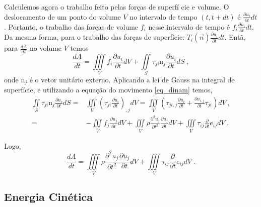 Calculemos agora  o trabalho feito pelas for\c{c}as de superf\'i
cie e volume. O deslocamento de um ponto do volume $V$ no
intervalo de tempo $(t,t+dt)$ \'e $\frac{\partial u_{i}}{\partial
t}dt$. Portanto, o trabalho das  for\c{c}as de volume $f_{i}$ nesse
intervalo de tempo \'e $f_{i}\frac{\partial
u_{i}}{\partial t}dt$. Da mesma forma, para o trabalho das
for\c{c}as de  superf\'icie: $T_{i}(\vec{n})\frac{\partial
u_{i}}{\partial t}dt$. Ent\~a, para $\frac{dA}{dt}$ no volume $V$ temos
\begin{equation}
\frac{dA}{dt}=\iiint\limits_{V}f_{i}\frac{\partial u_{i}}{\partial t}dV+\iint\limits_{S}
\tau_{ji}\mbox{n}_{j}\frac{\partial u_{i}}{\partial t}dS \;,
\end{equation}
onde
$\mbox{n}_{j}$ \'e o vetor unit\'ario externo. Aplicando a lei de
Gauss na integral de superf\'icie, e utilizando a equa\c{c}\~ao do movimento \ref{eq_dinam} temos,
\begin{align}
\iint\limits_{S}\tau_{ji}\mbox{n}_{j}\frac{\partial u_{i}}{\partial t}dS= 
&\iiint\limits_{V}\left(\tau_{ji}\frac{\partial
u_{i}}{\partial t}\right)_{,j}dV= \iiint\limits_{V} 
  \left(\tau_{ji,j}\frac{\partial u_{i}}{\partial t}+
\frac{\partial u_{i,j}}{\partial t}\tau_{ji}\right)dV \, ,\\
  =&-\iiint\limits_{V} f_{j}\frac{\partial u_{j}}{\partial t}dV+
\iiint\limits_{V}\rho\frac{\partial^{2}
u_{j}}{\partial t^{2}}\frac{\partial u_{j}}{\partial t}dV+
\iiint\limits_{V} \tau_{ij}\frac{\partial}{\partial
t}e_{ij}dV \;.
\end{align}

Logo,
\begin{equation}
\frac{dA}{dt}=\iiint\limits_{V} \rho\frac{\partial^{2} u_{j}}{\partial t^{2}}\frac{\partial u_{j}}{\partial t}dV+
\iiint\limits_{V} \tau_{ij}\frac{\partial}{\partial t}e_{ij}dV \;.
\end{equation}

\subsection{Energia Cin\'etica}

